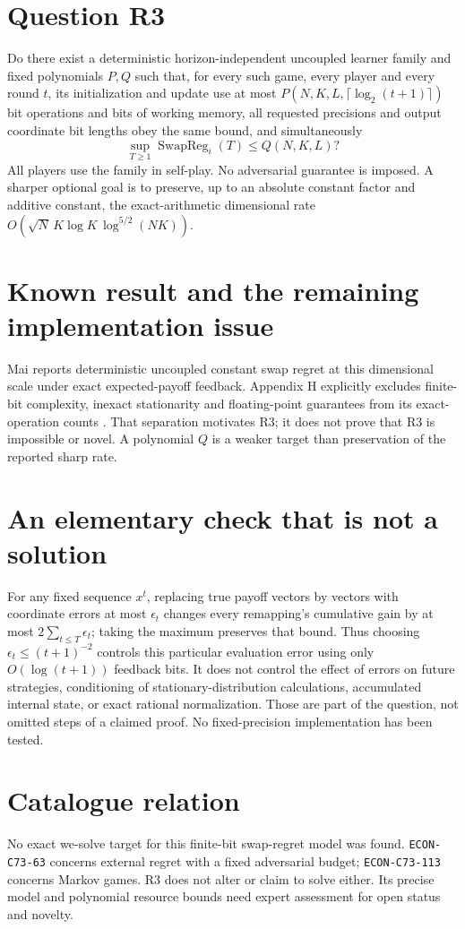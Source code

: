 \documentclass[11pt]{article}
\newcommand{\SwapReg}{\operatorname{SwapReg}}
\begin{document}
\section*{Question R3}
Do there exist a deterministic horizon-independent uncoupled learner
family and fixed polynomials $P,Q$ such that, for every such game,
every player and every round $t$, its initialization and update use
at most $P(N,K,L,\lceil\log_2(t+1)\rceil)$ bit operations and bits of
working memory, all requested precisions and output coordinate bit
lengths obey the same bound, and simultaneously
\[
 \sup_{T\geq1}\SwapReg_i(T)\leq Q(N,K,L)?
\]
All players use the family in self-play. No adversarial guarantee is
imposed. A sharper optional goal is to preserve, up to an absolute
constant factor and additive constant, the exact-arithmetic dimensional
rate $O(\sqrt N\,K\log K\,\log^{5/2}(NK))$.

\section*{Known result and the remaining implementation issue}
Mai reports deterministic uncoupled constant swap regret at this
dimensional scale under exact expected-payoff feedback. Appendix H
explicitly excludes finite-bit complexity, inexact stationarity and
floating-point guarantees from its exact-operation counts \cite{mai}.
That separation motivates R3; it does not prove that R3 is impossible
or novel. A polynomial $Q$ is a weaker target than preservation of the
reported sharp rate.

\section*{An elementary check that is not a solution}
For any fixed sequence $x^t$, replacing true payoff vectors by vectors
with coordinate errors at most $\epsilon_t$ changes every remapping's
cumulative gain by at most $2\sum_{t\leq T}\epsilon_t$; taking the
maximum preserves that bound. Thus choosing
$\epsilon_t\leq(t+1)^{-2}$ controls this particular evaluation error
using only $O(\log(t+1))$ feedback bits. It does not control the effect
of errors on future strategies, conditioning of stationary-distribution
calculations, accumulated internal state, or exact rational
normalization. Those are part of the question, not omitted steps of a
claimed proof. No fixed-precision implementation has been tested.

\section*{Catalogue relation}
No exact we-solve target for this finite-bit swap-regret model was found.
\texttt{ECON-C73-63} concerns external regret with a fixed adversarial
budget; \texttt{ECON-C73-113} concerns Markov games. R3 does not alter or
claim to solve either. Its precise model and polynomial resource bounds
need expert assessment for open status and novelty.
\end{document}
